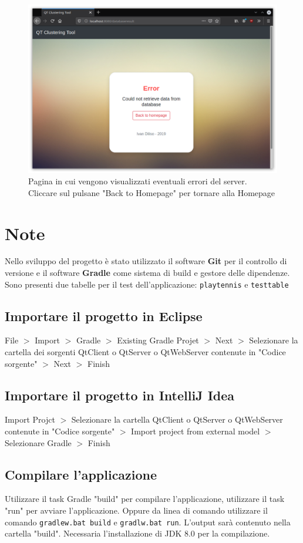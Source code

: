 \documentclass{article}
\begin{document}
    \begin{figure}[H]
        \includegraphics[scale=0.4]{ADDON8}
        \caption{Pagina in cui vengono visualizzati eventuali errori del 
        server. Cliccare sul pulsane "Back to Homepage" per tornare alla 
        Homepage}   
        \label{fig:12}
    \end{figure} 


    \section{Note}
    Nello sviluppo del progetto è stato utilizzato il software 
    \textbf{Git} per il controllo di versione e il software 
    \textbf{Gradle} come sistema di build e gestore delle dipendenze.
    Sono presenti due tabelle per il test dell'applicazione: \verb|playtennis| 
    e \verb|testtable|
        \subsection{Importare il progetto in Eclipse}
        File $>$ Import $>$ Gradle $>$ Existing Gradle Projet $>$ Next $>$
        Selezionare la cartella dei sorgenti QtClient o QtServer o QtWebServer 
        contenute in "Codice sorgente"
        $>$ Next $>$
        Finish
        \subsection{Importare il progetto in IntelliJ  Idea}
        Import Projct $>$
         Selezionare la cartella  QtClient o QtServer o QtWebServer 
         contenute in "Codice sorgente"
         $>$
        Import project from external model $>$ Selezionare Gradle $>$ Finish 

        \subsection{Compilare l'applicazione}
        Utilizzare il task Gradle "build" per compilare l'applicazione, 
        utilizzare il task "run" per avviare l'applicazione. Oppure da linea 
        di comando utilizzare
        il comando \verb|gradlew.bat build| e \verb|gradlw.bat run|. 
        L'output sarà contenuto nella cartella "build". Necessaria l'installazione
        di JDK 8.0 per la compilazione.
\end{document}
